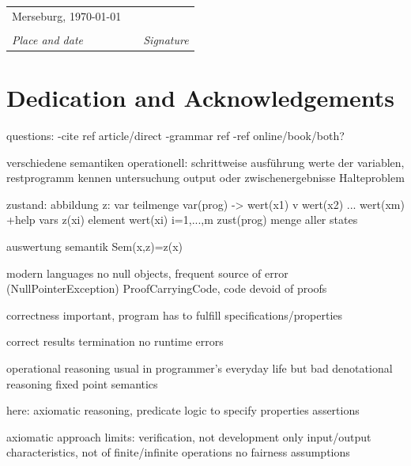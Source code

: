 \vspace{2cm}

\begin{center}
	\begin{tabular}{@{}p{5cm}@{}p{2cm}@{}p{5cm}}
		Merseburg, \today & &  \\
		\dotfill & & \dotfill \\
		\emph{Place and date} & & \emph{Signature} \\
	\end{tabular}
	\par
\end{center}

\newpage

\section*{{\huge{}Dedication and Acknowledgements}}



questions:
-cite ref article/direct
-grammar ref
-ref online/book/both?

verschiedene semantiken
operationell: schrittweise ausführung
werte der variablen, restprogramm kennen
untersuchung output oder zwischenergebnisse
Halteproblem

zustand: abbildung z: var teilmenge var(prog) -> wert(x1) v wert(x2) ... wert(xm)
+help vars
z(xi) element wert(xi) i=1,...,m
zust(prog) menge aller states

auswertung semantik
Sem(x,z)=z(x)

\cite{motivation_science}


modern languages no null objects, frequent source of error (NullPointerException)
ProofCarryingCode, code devoid of proofs

correctness important, program has to fulfill specifications/properties

correct results
termination
no runtime errors

operational reasoning usual in programmer's everyday life but bad
denotational reasoning
fixed point semantics

here: axiomatic reasoning, predicate logic to specify properties
assertions

axiomatic approach limits:
verification, not development
only input/output characteristics, not of finite/infinite operations
no fairness assumptions


